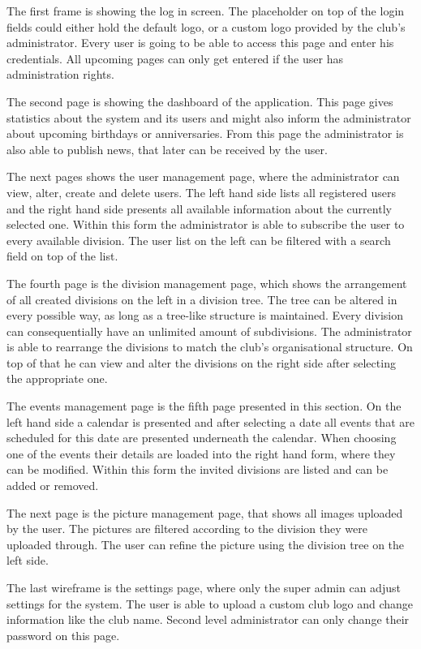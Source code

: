 The first frame is showing the log in screen. The placeholder on top of the login fields could either hold the default logo, or a custom logo provided by the club's administrator. Every user is going to be able to access this page and enter his credentials. All upcoming pages can only get entered if the user has administration rights.

The second page is showing the dashboard of the application. This page gives statistics about the system and its users and might also inform the administrator about upcoming birthdays or anniversaries. From this page the administrator is also able to publish news, that later can be received by the user.

The next pages shows the user management page, where the administrator can view, alter, create and delete users. The left hand side lists all registered users and the right hand side presents all available information about the currently selected one. Within this form the administrator is able to subscribe the user to every available division. The user list on the left can be filtered with a search field on top of the list.

The fourth page is the division management page, which shows the arrangement of all created divisions on the left in a division tree. The tree can be altered in every possible way, as long as a tree-like structure is maintained. Every division can consequentially have an unlimited amount of subdivisions. The administrator is able to rearrange the divisions to match the club's organisational structure. On top of that he can view and alter the divisions on the right side after selecting the appropriate one. 

The events management page is the fifth page presented in this section. On the left hand side a calendar is presented and after selecting a date all events that are scheduled for this date are presented underneath the calendar. When choosing one of the events their details are loaded into the right hand form, where they can be modified. Within this form the invited divisions are listed and can be added or removed.

The next page is the picture management page, that shows all images uploaded by the user. The pictures are filtered according to the division they were uploaded through. The user can refine the picture using the division tree on the left side.

The last wireframe is the settings page, where only the super admin can adjust settings for the system. The user is able to upload a custom club logo and change information like the club name. Second level administrator can only change their password on this page. 

